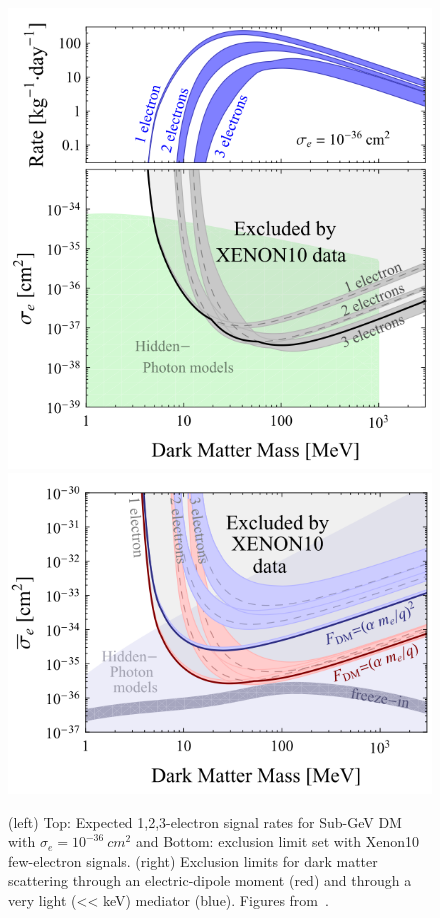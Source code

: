 \begin{figure}[htbp]
\begin{center}
\includegraphics[width=\halffig]{figures/lxetpcs/subGeV.png}
\includegraphics[width=\halffig]{figures/lxetpcs/subGeV2.png}
\caption{(left) Top: Expected 1,2,3-electron signal rates for Sub-GeV DM with $\sigma_{e} = 10^{-36}~cm^{2}$ and Bottom: exclusion limit set with Xenon10 few-electron signals. (right) Exclusion limits for dark matter scattering through an electric-dipole moment (red) and through a very light (<< keV) mediator (blue). Figures from~\cite{Essig2012}. }
\label{fig:subGeV}
\end{center}
\end{figure}

